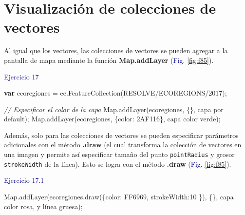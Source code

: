 \documentclass[
  12pt,
  letterpaper,
  twoside]{book}
\newenvironment{Shaded}{\begin{snugshade}}{\end{snugshade}}
\newcommand{\CommentTok}[1]{\textcolor[rgb]{0.24,0.58,0.00}{\textit{#1}}}
\newcommand{\ControlFlowTok}[1]{\textcolor[rgb]{0.00,0.00,0.00}{\textbf{#1}}}
\newcommand{\DataTypeTok}[1]{\textcolor[rgb]{0.00,0.00,0.00}{#1}}
\newcommand{\DecValTok}[1]{\textcolor[rgb]{0.28,0.53,0.93}{#1}}
\newcommand{\FunctionTok}[1]{\textcolor[rgb]{0.48,0.12,0.64}{#1}}
\newcommand{\KeywordTok}[1]{\textcolor[rgb]{0.48,0.12,0.64}{#1}}
\newcommand{\NormalTok}[1]{#1}
\newcommand{\OperatorTok}[1]{\textcolor[rgb]{0.00,0.00,0.00}{#1}}
\newcommand{\StringTok}[1]{\textcolor[rgb]{0.87,0.29,0.22}{#1}}
\newcommand\boldpurple[1]{\textcolor{darkpurple}{\textbf{#1}}}
\begin{document}
\hypertarget{visualizaciuxf3n-de-colecciones-de-vectores}{%
\section{Visualización de colecciones de vectores}\label{visualizaciuxf3n-de-colecciones-de-vectores}}

Al igual que los vectores, las colecciones de vectores se pueden agregar a la pantalla de mapa mediante la función \boldpurple{Map.addLayer} (\textcolor{darkblue}{Fig.} \ref{fig:f85}).

\textcolor{darkblue}{Ejercicio 17}

\begin{Shaded}
\begin{Highlighting}[]
\ControlFlowTok{var}\NormalTok{ ecoregiones }\OperatorTok{=} \KeywordTok{ee}\OperatorTok{.}\FunctionTok{FeatureCollection}\NormalTok{(}\StringTok{\textquotesingle{}RESOLVE/ECOREGIONS/2017\textquotesingle{}}\NormalTok{)}\OperatorTok{;}

\CommentTok{// Especificar el color de la capa }
\KeywordTok{Map}\OperatorTok{.}\FunctionTok{addLayer}\NormalTok{(ecoregiones}\OperatorTok{,}\NormalTok{ \{\}}\OperatorTok{,} \StringTok{\textquotesingle{}capa por default\textquotesingle{}}\NormalTok{)}\OperatorTok{;}
\KeywordTok{Map}\OperatorTok{.}\FunctionTok{addLayer}\NormalTok{(ecoregiones}\OperatorTok{,}\NormalTok{ \{}\DataTypeTok{color}\OperatorTok{:} \StringTok{\textquotesingle{}2AF116\textquotesingle{}}\NormalTok{\}}\OperatorTok{,} \StringTok{\textquotesingle{}capa color verde\textquotesingle{}}\NormalTok{)}\OperatorTok{;}
\end{Highlighting}
\end{Shaded}

Además, solo para las colecciones de vectores se pueden especificar parámetros adicionales con el método \boldpurple{.draw} (el cual transforma la colección de vectores en una imagen y permite así especificar tamaño del punto \texttt{pointRadius} y grosor \texttt{strokeWidth} de la línea). Esto se logra con el método \boldpurple{.draw} (\textcolor{darkblue}{Fig.} \ref{fig:f85}).

\textcolor{darkblue}{Ejercicio 17.1}

\begin{Shaded}
\begin{Highlighting}[]
\KeywordTok{Map}\OperatorTok{.}\FunctionTok{addLayer}\NormalTok{(ecoregiones}\OperatorTok{.}\FunctionTok{draw}\NormalTok{(\{}\DataTypeTok{color}\OperatorTok{:} \StringTok{\textquotesingle{}FF6969\textquotesingle{}}\OperatorTok{,} \DataTypeTok{strokeWidth}\OperatorTok{:}\DecValTok{10}\NormalTok{ \})}\OperatorTok{,}\NormalTok{ \{\}}\OperatorTok{,}
  \StringTok{\textquotesingle{}capa color rosa, y línea gruesa\textquotesingle{}}\NormalTok{)}\OperatorTok{;}
\end{Highlighting}
\end{Shaded}
\end{document}
